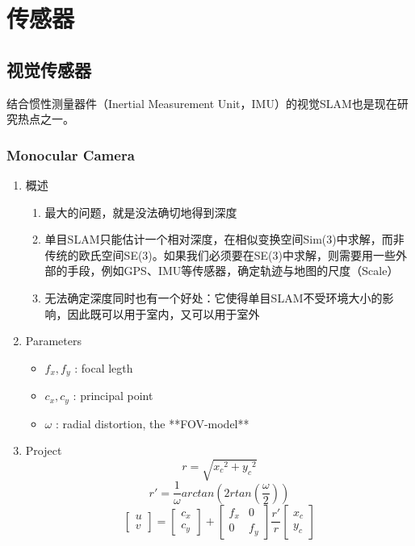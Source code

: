 \chapter{传感器}

\section{视觉传感器}

结合惯性测量器件（Inertial Measurement Unit，IMU）的视觉SLAM也是现在研究热点之一。

\subsection{Monocular Camera}

\begin{enumerate}

\item 概述
\begin{enumerate}
\item 最大的问题，就是没法确切地得到深度
\item 单目SLAM只能估计一个相对深度，在相似变换空间Sim(3)中求解，而非传统的欧氏空间SE(3)。如果我们必须要在SE(3)中求解，则需要用一些外部的手段，例如GPS、IMU等传感器，确定轨迹与地图的尺度（Scale）
\item 无法确定深度同时也有一个好处：它使得单目SLAM不受环境大小的影响，因此既可以用于室内，又可以用于室外
\end{enumerate}

\item Parameters
\begin{itemize}
\item $f_x,f_y$ : focal legth
\item $c_x,c_y$ : principal point
\item $\omega$ : radial distortion, the **FOV-model**
\end{itemize}

\item Project
\begin{equation} r = \sqrt{{x_c}^2+{y_c}^2} \end{equation}
\begin{equation} r'= \frac{1}{\omega}arctan(2r tan(\frac{\omega}{2})) \end{equation}
\begin{equation}
\left[\begin{array}{c}u\\v\end{array}\right] =  
\left[\begin{array}{c}c_x\\c_y\end{array}\right] +
\left[\begin{array}{cc}f_x&0\\0&f_y\end{array}\right]  
\frac{r'}{r}
\left[\begin{array}{c}x_c\\y_c\end{array}\right]
\end{equation}


\end{enumerate}
